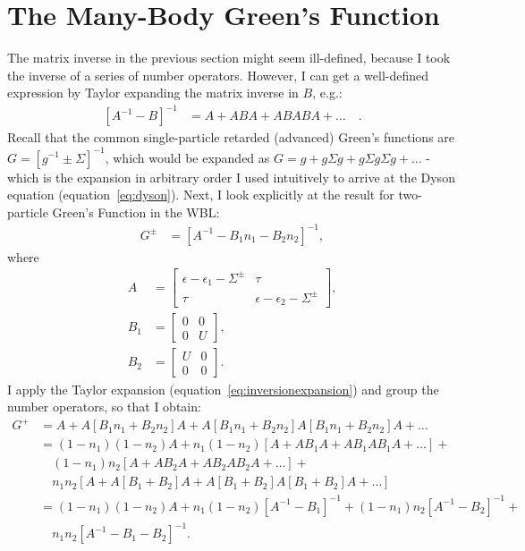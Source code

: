 \section{The Many-Body Green's Function}
\label{sec:mbgfno}
The matrix inverse in the previous section might seem ill-defined, because I took the inverse of a series of number operators. However, I can get a well-defined expression by Taylor expanding the matrix inverse in $B$, e.g.:
\begin{align}
\left[ A^{-1} - B\right]^{-1} &= A + ABA + ABABA + \ldots\quad.
\label{eq:inversionexpansion}
\end{align}
Recall that the common single-particle retarded (advanced) Green's functions are $G = \left[ g^{-1} \pm \Sigma \right]^{-1}$, which would be expanded as $G = g + g\Sigma g + g\Sigma g\Sigma g + \ldots$ - which is the expansion in arbitrary order I used intuitively to arrive at the Dyson equation (equation~\ref{eq:dyson}). Next, I look explicitly at the result for two-particle Green's Function in the WBL:
\begin{align*}
G^\pm  &= \left[ A^{-1} - B_1 n_1 - B_2 n_2 \right]^{-1},
\end{align*}
where 
\begin{align*}
A &= \begin{bmatrix} \epsilon - \epsilon_1 - \Sigma^\pm & \tau \\
\tau & \epsilon - \epsilon_2 - \Sigma^\pm \end{bmatrix},\\
B_1 &= \begin{bmatrix} 0 & 0 \\ 0 & U \end{bmatrix},\\
B_2 &= \begin{bmatrix} U & 0 \\ 0 & 0 \end{bmatrix}.
\end{align*}
I apply the Taylor expansion (equation~\ref{eq:inversionexpansion}) and group the number operators, so that I obtain:
\begin{align*}
G^+ &= A + A\left[B_1 n_1 + B_2 n_2\right]A + A\left[B_1 n_1 + B_2 n_2\right]  A\left[B_1 n_1 + B_2 n_2\right]  A + \ldots \\
&= (1-n_1)(1-n_2) A + n_1 (1-n_2)\left[A + AB_1 A + AB_1AB_1A + \ldots \right] + \\
&\quad (1-n_1)n_2 \left[ A + AB_2A + AB_2AB_2A + \ldots \right] +\\
&\quad n_1 n_2 \left[ A + A\left[B_1 + B_2\right]A+ A\left[B_1 + B_2\right]A\left[B_1 + B_2\right]A + \ldots\right] \\
&= (1-n_1)(1-n_2) A + n_1 (1-n_2) \left[ A^{-1} - B_1\right]^{-1} + (1-n_1) n_2 \left[ A^{-1} - B_2\right]^{-1} +\\&\quad n_1 n_2 \left[A^{-1} - B_1 - B_2 \right]^{-1}.
\end{align*}
